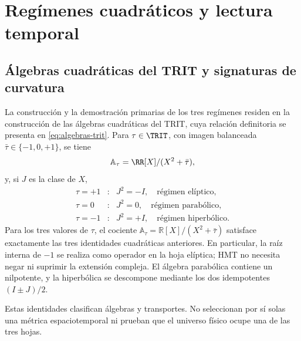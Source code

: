 \section{Regímenes cuadráticos y lectura temporal}
\label{v:rec:chap:regimenes-cuadraticos-tiempo}

\subsection{Álgebras cuadráticas del TRIT y signaturas de curvatura}
\label{v:rec:sec:regimenes-cuadraticos-recibidos}

La construcción y la demostración primarias de los tres regímenes residen en
la construcción de las álgebras cuadráticas del TRIT,
cuya relación definitoria se presenta en \eqref{eq:algebras-trit}. Para
\(\tau\in\TRIT\), con imagen balanceada
\(\bar\tau\in\{-1,0,+1\}\), se tiene
\[
 \mathbb A_\tau=\RR[X]/(X^2+\bar\tau),
\]
y, si \(J\) es la clase de \(X\),
\[
\begin{array}{ccl}
 \tau=+1&:&J^2=-I,\quad\text{régimen elíptico},\\
 \tau=0&:&J^2=0,\quad\text{régimen parabólico},\\
 \tau=-1&:&J^2=+I,\quad\text{régimen hiperbólico}.
\end{array}
\]
Para los tres valores de \(\tau\), el cociente
\(\mathbb A_\tau=\mathbb R[X]/(X^2+\bar\tau)\) satisface exactamente las tres
identidades cuadráticas anteriores. En particular, la raíz interna de
\(-1\) se realiza como operador en la hoja elíptica; HMT no necesita negar ni
suprimir la extensión compleja. El álgebra parabólica contiene un nilpotente,
y la hiperbólica se descompone mediante los dos idempotentes
\((I\pm J)/2\).

Estas identidades clasifican álgebras y transportes. No seleccionan por sí
solas una métrica espaciotemporal ni prueban que el universo físico ocupe una
de las tres hojas.

